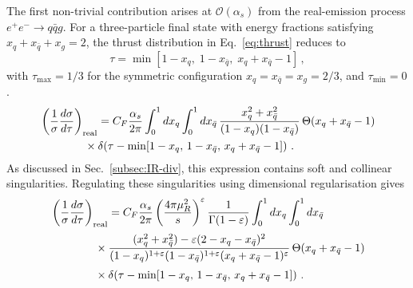 The first non-trivial contribution arises 
at $\mathcal{O}(\alpha_s)$ from the real-emission process $
e^+e^- \to q\bar{q}g$. For a 
three-particle final state with energy fractions satisfying 
$x_q + x_{\bar{q}} + x_g = 2$, the thrust distribution in
Eq.~\eqref{eq:thrust} reduces to
\begin{equation}
\label{eq:tau-three-parton}
    \tau = \min\!\left[1-x_q,\; 1-x_{\bar{q}},\;x_q+x_{\bar{q}}-1\right]\,,
\end{equation}
with $\tau_{\max} = 1/3$ for the symmetric
configuration $x_q = x_{\bar{q}} = x_g = 2/3$, and $\tau_{\min} = 0$.
\begin{equation}
\begin{aligned}
   & \left(\frac{1}{\sigma}\frac{d\sigma}{d\tau}\right)_{\rm real}
    = C_F \frac{\alpha_s}{2\pi}
      \int_0^1 dx_q \int_0^1 dx_{\bar{q}}\,
      \frac{x_q^2 + x_{\bar{q}}^2}{(1-x_q)(1-x_{\bar{q}})}
      \, \Theta\!\left(x_q+x_{\bar{q}}-1\right)\\
      &\qquad \qquad \times\delta\!\left(\tau - \min\!\left[1-x_q,\, 1-x_{\bar{q}},\,
                                       x_q+x_{\bar{q}}-1\right]\right)\,.
\end{aligned}
\end{equation}
As discussed in Sec.~\ref{subsec:IR-div}, this expression
contains soft and collinear singularities. Regulating these singularities
using dimensional regularisation gives
\begin{equation}
\begin{aligned}
    &\left(\frac{1}{\sigma}\frac{d\sigma}{d\tau}\right)_{\rm real}
    = C_F\frac{\alpha_s}{2\pi}
      \left(\frac{4\pi\mu_R^2}{s}\right)^\varepsilon
      \frac{1}{\Gamma(1-\varepsilon)}
      \int_0^1 dx_q \int_0^1 dx_{\bar{q}}\\[0.5ex]
    &\qquad\qquad\times\frac{(x_q^2+x_{\bar{q}}^2)
            -\varepsilon(2-x_q-x_{\bar{q}})^2}
           {(1-x_q)^{1+\varepsilon}
            (1-x_{\bar{q}})^{1+\varepsilon}
            (x_q+x_{\bar{q}}-1)^\varepsilon}\,
      \Theta\!\left(x_q+x_{\bar{q}}-1\right)\\[0.5ex]
    &\qquad\qquad\times
      \delta\!\left(\tau - \min\!\left[1-x_q,\,1-x_{\bar{q}},\,
                                       x_q+x_{\bar{q}}-1\right]\right)\,.
\end{aligned}
\end{equation}

